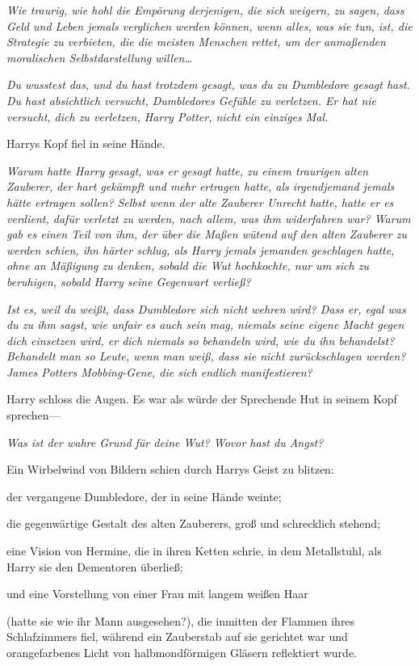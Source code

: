 {\emph{Wie traurig, wie hohl die Empörung derjenigen, die sich weigern, zu sagen, dass Geld und Leben jemals verglichen werden können, wenn alles, was sie tun, ist, die Strategie zu verbieten, die die meisten Menschen rettet, um der anmaßenden moralischen Selbstdarstellung willen…}

\emph{Du wusstest das, und du hast trotzdem gesagt, was du zu Dumbledore gesagt hast. Du hast absichtlich versucht, Dumbledores Gefühle zu verletzen. Er hat nie versucht, dich zu verletzen, Harry Potter, nicht ein einziges Mal.}

Harrys Kopf fiel in seine Hände.

\emph{Warum hatte Harry gesagt, was er gesagt hatte, zu einem traurigen alten Zauberer,} \emph{der hart gekämpft und mehr ertragen hatte, als irgendjemand jemals hätte ertragen sollen?} \emph{Selbst wenn der alte Zauberer Unrecht hatte, hatte er es verdient, dafür verletzt zu werden, nach allem, was ihm widerfahren war? Warum gab es einen Teil von ihm, der über die Maßen wütend auf den alten Zauberer zu werden schien, ihn härter schlug, als Harry jemals jemanden geschlagen hatte, ohne an Mäßigung zu denken, sobald die Wut hochkochte, nur um sich zu beruhigen, sobald Harry seine Gegenwart verließ?}

\emph{Ist es, weil du weißt, dass Dumbledore sich nicht wehren wird? Dass er, egal was du zu ihm sagst, wie unfair es auch sein mag, niemals seine eigene Macht gegen dich einsetzen wird, er dich niemals so behandeln wird, wie du ihn behandelst? Behandelt man so Leute, wenn man weiß, dass sie nicht zurückschlagen werden? James Potters Mobbing-Gene, die sich endlich manifestieren?}

Harry schloss die Augen. Es war als würde der Sprechende Hut in seinem Kopf sprechen—

\emph{Was ist der wahre Grund für deine Wut? Wovor hast du Angst?}

Ein Wirbelwind von Bildern schien durch Harrys Geist zu blitzen:

der vergangene Dumbledore, der in seine Hände weinte;

die gegenwärtige Gestalt des alten Zauberers, groß und schrecklich stehend;

eine Vision von Hermine, die in ihren Ketten schrie, in dem Metallstuhl, als Harry sie den Dementoren überließ;

und eine Vorstellung von einer Frau mit langem weißen Haar

(hatte sie wie ihr Mann ausgesehen?), die inmitten der Flammen ihres Schlafzimmers fiel, während ein Zauberstab auf sie gerichtet war und orangefarbenes Licht von halbmondförmigen Gläsern reflektiert wurde.

}
